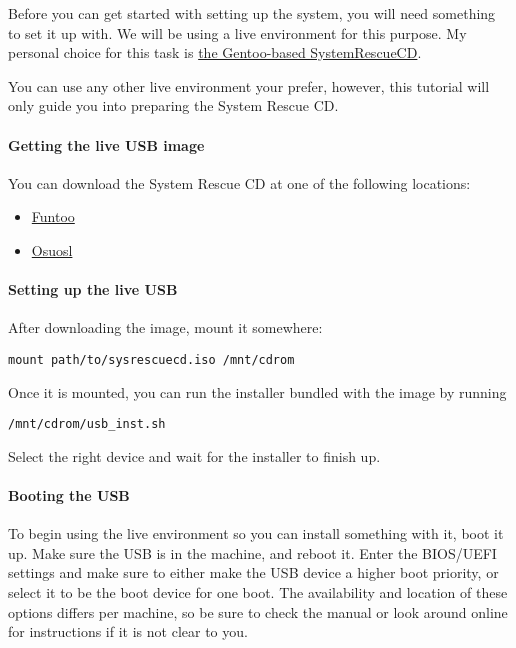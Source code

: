 Before you can get started with setting up the system, you will need
something to set it up with. We will be using a live environment for
this purpose. My personal choice for this task is
\href{http://www.system-rescue-cd.org/SystemRescueCd_Homepage}{the
Gentoo-based SystemRescueCD}.

You can use any other live environment your prefer, however, this
tutorial will only guide you into preparing the System Rescue CD.

\paragraph{Getting the live USB image}\label{getting-the-live-usb-image}

You can download the System Rescue CD at one of the following locations:

\begin{itemize}
\tightlist
\item
  \href{http://build.funtoo.org/distfiles/sysresccd/systemrescuecd-x86-4.7.1.iso}{Funtoo}
\item
  \href{http://ftp.osuosl.org/pub/funtoo/distfiles/sysresccd/systemrescuecd-x86-4.7.1.iso}{Osuosl}
\end{itemize}

\paragraph{Setting up the live USB}\label{setting-up-the-live-usb}

After downloading the image, mount it somewhere:

\begin{verbatim}
mount path/to/sysrescuecd.iso /mnt/cdrom
\end{verbatim}

Once it is mounted, you can run the installer bundled with the image by
running

\begin{verbatim}
/mnt/cdrom/usb_inst.sh
\end{verbatim}

Select the right device and wait for the installer to finish up.

\paragraph{Booting the USB}\label{booting-the-usb}

To begin using the live environment so you can install something with
it, boot it up. Make sure the USB is in the machine, and reboot it.
Enter the BIOS/UEFI settings and make sure to either make the USB device
a higher boot priority, or select it to be the boot device for one boot.
The availability and location of these options differs per machine, so
be sure to check the manual or look around online for instructions if it
is not clear to you.

